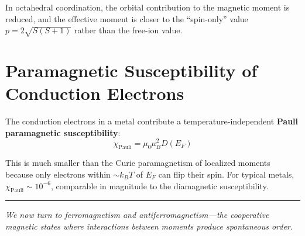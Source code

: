 In octahedral coordination, the orbital contribution to the magnetic moment is reduced, and the effective moment is closer to the ``spin-only'' value $p = 2\sqrt{S(S+1)}$ rather than the free-ion value.

\section{Paramagnetic Susceptibility of Conduction Electrons}

The conduction electrons in a metal contribute a temperature-independent \textbf{Pauli paramagnetic susceptibility}:
\begin{equation}
  \chi_{\text{Pauli}} = \mu_0 \mu_B^2 D(E_F)
\end{equation}

This is much smaller than the Curie paramagnetism of localized moments because only electrons within $\sim k_BT$ of $E_F$ can flip their spin. For typical metals, $\chi_{\text{Pauli}} \sim 10^{-6}$, comparable in magnitude to the diamagnetic susceptibility.

\vspace{1cm}
\noindent\rule{\textwidth}{0.4pt}
\textit{We now turn to ferromagnetism and antiferromagnetism---the cooperative magnetic states where interactions between moments produce spontaneous order.}
